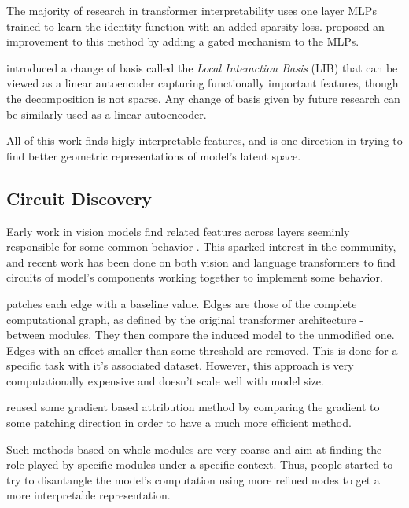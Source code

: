 \documentclass{article}
\begin{document}
The majority of research in transformer interpretability uses one layer MLPs \citep{cunningham2023sparse, gao2024scaling} trained to learn the identity function with an added sparsity loss. \citet{rajamanoharan2024improving} proposed an improvement to this method by adding a gated mechanism to the MLPs.

\citet{bushnaq2024using} introduced a change of basis called the \textit{Local Interaction Basis} (LIB) that can be viewed as a linear autoencoder capturing functionally important features, though the decomposition is not sparse. Any change of basis given by future research can be similarly used as a linear autoencoder.%

All of this work finds higly interpretable features, and is one direction in trying to find better geometric representations of model's latent space.

\subsection{Circuit Discovery}
\label{sec:circuit_discovery}

Early work in vision models find related features across layers seeminly responsible for some common behavior \citep{olah2020zoomCircuits}. This sparked interest in the community, and recent work has been done on both vision and language transformers to find circuits of model's components working together to implement some behavior.

\citet{conmy2023automatedACDCCircuits} patches each edge with a baseline value. Edges are those of the complete computational graph, as defined by the original transformer architecture - between modules. They then compare the induced model to the unmodified one. Edges with an effect smaller than some threshold are removed. This is done for a specific task with it's associated dataset. However, this approach is very computationally expensive and doesn't scale well with model size.

\citet{syed2023attributionCircuits} reused some gradient based attribution method by comparing the gradient to some patching direction in order to have a much more efficient method.

Such methods based on whole modules are very coarse and aim at finding the role played by specific modules under a specific context. Thus, people started to try to disantangle the model's computation using more refined nodes to get a more interpretable representation.
\end{document}
